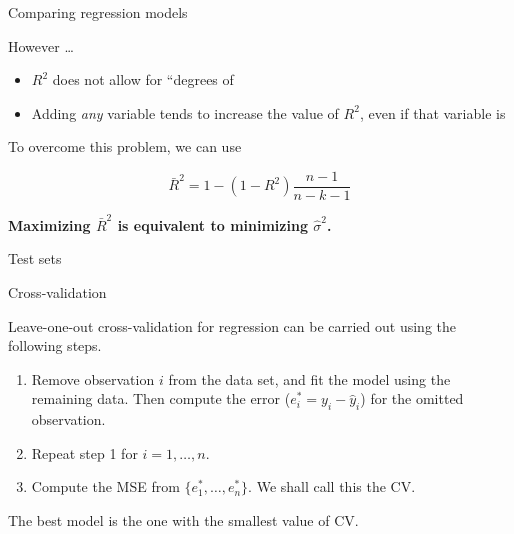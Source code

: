 \documentclass[14pt]{beamer}
\makeatletter
\def\biz{\begin{itemize}[<+-| alert@+>]}
\def\eiz{\end{itemize}}
\def\ben{\begin{enumerate}[<+-| alert@+>]}
\def\een{\end{enumerate}}
\makeatother
\begin{document}
\begin{frame}{Comparing regression models}

However \dots
\biz
\item $R^2$  does not allow for ``degrees of 

\item Adding \textit{any} variable tends to increase the value of $R^2$, even if that variable is
\eiz\pause

To overcome   this problem, we can use 
\begin{block}{}
\[
\bar{R}^2 = 1-(1-R^2)\frac{n-1}{n-k-1}
\]
\end{block}
\pause

\centerline{\textcolor[rgb]{0.8,0.00,0.00}{\textbf{Maximizing $\bar{R}^2$ is equivalent to minimizing $\hat\sigma^2$.}}}

\end{frame}


\begin{frame}{Test sets}


\end{frame}

\begin{frame}{Cross-validation}

Leave-one-out cross-validation for regression can be carried out using the following steps.
\ben
\item Remove observation $i$ from the data set, and fit the model using the remaining data. Then compute the error ($e_i^*=y_i-\hat{y}_i$) for the omitted observation.
\item Repeat step 1 for $i=1,\dots,n$.
\item Compute the MSE from $\{e_1^*,\dots,e_n^*\}$. We shall call this the CV.
\een\pause
The best model is the one with the smallest value of CV.
\end{frame}
\end{document}

